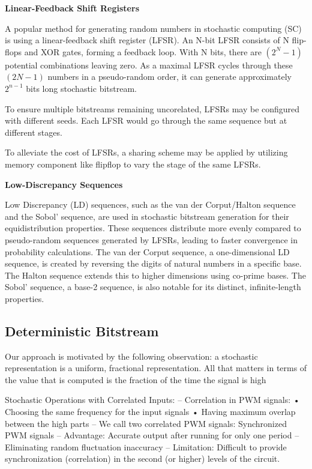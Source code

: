 \textbf {Linear-Feedback Shift Registers}

A popular method for generating random numbers in stochastic computing (SC) is
using a linear-feedback shift register (LFSR). An N-bit LFSR consists of N
flip-flops and XOR gates, forming a feedback loop. With N bits, there are
$ (2^ N - 1)$ potential combinations leaving zero. As a maximal LFSR
cycles through these  $(2 N - 1 )$ numbers in a pseudo-random order, it can generate approximately  $2^ {n-1}$ bits long stochastic bitstream. 

To ensure multiple bitstreams remaining uncorelated, LFSRs may be configured with different seeds. Each LFSR would go through the same sequence but at different stages. 

To alleviate the cost of LFSRs, a sharing scheme may be applied by utilizing memory component like flipflop to vary the stage of the same LFSRs. 


\textbf {Low-Discrepancy Sequences}

Low Discrepancy (LD) sequences, such as the van der Corput/Halton sequence and
the Sobol' sequence, are used in stochastic bitstream generation for their
equidistribution properties. These sequences distribute more evenly compared to
pseudo-random sequences generated by LFSRs, leading to faster convergence in
probability calculations. The van der Corput sequence, a one-dimensional LD
sequence, is created by reversing the digits of natural numbers in a specific
base. The Halton sequence extends this to higher dimensions using co-prime bases.
The Sobol' sequence, a base-2 sequence, is also notable for its distinct,
infinite-length properties.


\subsection{Deterministic Bitstream}

Our approach is motivated by the following observation: a stochastic representation is a uniform, fractional representation. All that matters in terms of the value that is computed is 
the fraction of the time the signal is high

Stochastic Operations with Correlated Inputs:
– Correlation in PWM signals:
• Choosing the same frequency for the input signals
• Having maximum overlap between the high parts
– We call two correlated PWM signals:
Synchronized PWM signals
– Advantage: Accurate output after running for only one period
– Eliminating random fluctuation inaccuracy
– Limitation: Difficult to provide synchronization (correlation) in the
second (or higher) levels of the circuit.



